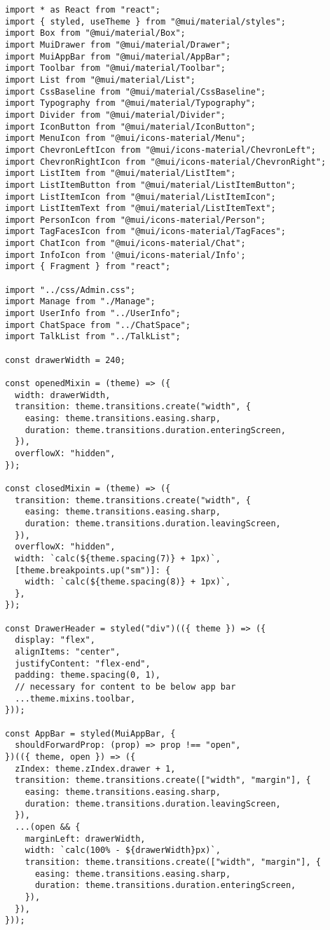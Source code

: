 \begin{verbatim}
import * as React from "react";
import { styled, useTheme } from "@mui/material/styles";
import Box from "@mui/material/Box";
import MuiDrawer from "@mui/material/Drawer";
import MuiAppBar from "@mui/material/AppBar";
import Toolbar from "@mui/material/Toolbar";
import List from "@mui/material/List";
import CssBaseline from "@mui/material/CssBaseline";
import Typography from "@mui/material/Typography";
import Divider from "@mui/material/Divider";
import IconButton from "@mui/material/IconButton";
import MenuIcon from "@mui/icons-material/Menu";
import ChevronLeftIcon from "@mui/icons-material/ChevronLeft";
import ChevronRightIcon from "@mui/icons-material/ChevronRight";
import ListItem from "@mui/material/ListItem";
import ListItemButton from "@mui/material/ListItemButton";
import ListItemIcon from "@mui/material/ListItemIcon";
import ListItemText from "@mui/material/ListItemText";
import PersonIcon from "@mui/icons-material/Person";
import TagFacesIcon from "@mui/icons-material/TagFaces";
import ChatIcon from "@mui/icons-material/Chat";
import InfoIcon from '@mui/icons-material/Info';
import { Fragment } from "react";

import "../css/Admin.css";
import Manage from "./Manage";
import UserInfo from "../UserInfo";
import ChatSpace from "../ChatSpace";
import TalkList from "../TalkList";

const drawerWidth = 240;

const openedMixin = (theme) => ({
  width: drawerWidth,
  transition: theme.transitions.create("width", {
    easing: theme.transitions.easing.sharp,
    duration: theme.transitions.duration.enteringScreen,
  }),
  overflowX: "hidden",
});

const closedMixin = (theme) => ({
  transition: theme.transitions.create("width", {
    easing: theme.transitions.easing.sharp,
    duration: theme.transitions.duration.leavingScreen,
  }),
  overflowX: "hidden",
  width: `calc(${theme.spacing(7)} + 1px)`,
  [theme.breakpoints.up("sm")]: {
    width: `calc(${theme.spacing(8)} + 1px)`,
  },
});

const DrawerHeader = styled("div")(({ theme }) => ({
  display: "flex",
  alignItems: "center",
  justifyContent: "flex-end",
  padding: theme.spacing(0, 1),
  // necessary for content to be below app bar
  ...theme.mixins.toolbar,
}));

const AppBar = styled(MuiAppBar, {
  shouldForwardProp: (prop) => prop !== "open",
})(({ theme, open }) => ({
  zIndex: theme.zIndex.drawer + 1,
  transition: theme.transitions.create(["width", "margin"], {
    easing: theme.transitions.easing.sharp,
    duration: theme.transitions.duration.leavingScreen,
  }),
  ...(open && {
    marginLeft: drawerWidth,
    width: `calc(100% - ${drawerWidth}px)`,
    transition: theme.transitions.create(["width", "margin"], {
      easing: theme.transitions.easing.sharp,
      duration: theme.transitions.duration.enteringScreen,
    }),
  }),
}));


\end{verbatim}
